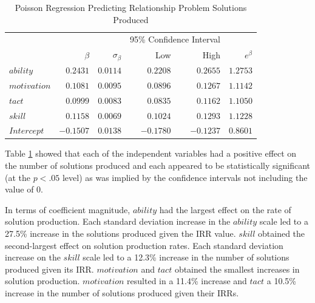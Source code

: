 \documentclass[man]{apa7}
\begin{document}
	\begin{table}[h!]
		\centering
		\caption{\centering Poisson Regression Predicting Relationship Problem Solutions Produced} 
		\begin{tabular}{l|rrrrr}
			\hline 
			\multicolumn{1}{l}{} &  &  & \multicolumn{2}{c}{95\% Confidence Interval} &   \\ 
			\multicolumn{1}{l}{} & $\beta$ & $\sigma_{\beta}$ & Low & High & $e^{\beta}$ \\ 
			\hline 
			$ability$ & $0.2431$ & $0.0114$ & $0.2208$ & $0.2655$ & $1.2753$ \\  
			$motivation$ & $0.1081$ & $0.0095$ & $0.0896$ & $0.1267$ & $1.1142$ \\ 
			$tact$ & $0.0999$ & $0.0083$ & $0.0835$ & $0.1162$ & $1.1050$ \\
			$skill$ & $0.1158$ & $0.0069$ & $0.1024$ & $0.1293$ & $1.1228$ \\ 
			$Intercept$ & $-0.1507$ & $0.0138$ & $-0.1780$ & $-0.1237$ & $0.8601$ \\
			\hline 
		\end{tabular}
		\label{tab:poisreg}
	\end{table}
	
	Table \ref{tab:poisreg} showed that each of the independent variables had a positive effect on the number of solutions produced and each appeared to be statistically significant (at the $p < .05$ level) as was implied by the confidence intervals not including the value of 0.
	
	In terms of coefficient magnitude, $ability$ had the largest effect on the rate of solution production. 
	Each standard deviation increase in the $ability$ scale led to a 27.5\% increase in the solutions produced given the IRR value.
	$skill$ obtained the second-largest effect on solution production rates.
	Each standard deviation increase on the $skill$ scale led to a 12.3\% increase in the number of solutions produced given its IRR.
	$motivation$ and $tact$ obtained the smallest increases in solution production.
	$motivation$ resulted in a 11.4\% increase and $tact$ a 10.5\% increase in the number of solutions produced given their IRRs. 
	
\end{document}
